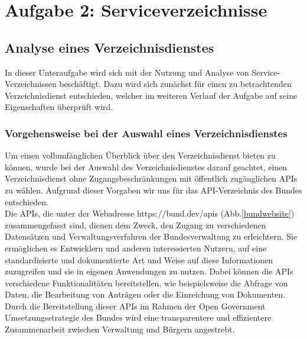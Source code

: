 \documentclass[notitlepage, hidelinks]{article}
\begin{document}
\thispagestyle{empty}
\clearpage
\newpage
\tableofcontents
\thispagestyle{empty}
\clearpage

\normalsize
{}


\section{Aufgabe 2: Serviceverzeichnisse}
\subsection{Analyse eines Verzeichnisdienstes}

In dieser Unteraufgabe wird sich mit der Nutzung und Analyse von Service-Verzeichnissen beschäftigt. Dazu wird sich zunächst für einen zu betrachtenden Verzeichnisdienst entschieden, welcher im weiteren Verlauf der Aufgabe auf seine Eigenschaften überprüft wird.

\subsubsection{Vorgehensweise bei der Auswahl eines Verzeichnisdienstes}
Um einen vollumfänglichen Überblick über den Verzeichnisdienst bieten zu können, wurde bei der Auswahl des Verzeichnisdienstes darauf geachtet, einen Verzeichnisdienst ohne Zugangsbeschränkungen mit öffentlich zugänglichen APIs zu wählen. Aufgrund dieser Vorgaben wir uns für das API-Verzeichnis des Bundes entschieden. \\
Die APIs, die unter der Webadresse https://bund.dev/apis (Abb.\ref{bundwebsite}) zusammengefasst sind, dienen dem Zweck, den Zugang zu verschiedenen Datensätzen und Verwaltungsverfahren der Bundesverwaltung zu erleichtern. Sie ermöglichen es Entwicklern und anderen interessierten Nutzern, auf eine standardisierte und dokumentierte Art und Weise auf diese Informationen zuzugreifen und sie in eigenen Anwendungen zu nutzen. Dabei können die APIs verschiedene Funktionalitäten bereitstellen, wie beispielsweise die Abfrage von Daten, die Bearbeitung von Anträgen oder die Einreichung von Dokumenten. Durch die Bereitstellung dieser APIs im Rahmen der Open Government Umsetzungsstrategie des Bundes wird eine transparentere und effizientere Zusammenarbeit zwischen Verwaltung und Bürgern angestrebt. 
\end{document}
